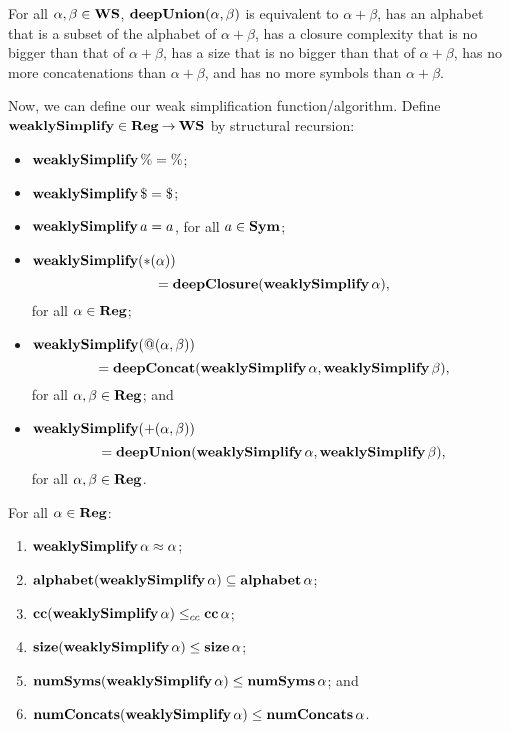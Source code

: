 \begin{lemma}
\label{DeepUnionLem}
For all $\alpha,\beta\in\mathbf{WS}$, $\mathbf{deepUnion}(\alpha,\beta)$
is equivalent to $\alpha+\beta$, has an alphabet that is a
subset of the alphabet of $\alpha+\beta$, has a closure complexity
that is no bigger than that of $\alpha+\beta$, has a size that is no
bigger than that of $\alpha+\beta$, has no more concatenations than
$\alpha+\beta$, and has no more symbols than $\alpha+\beta$.
\end{lemma}

Now, we can define our weak simplification function/algorithm.
%
Define $\mathbf{weaklySimplify}\in\mathbf{Reg}\mathbin{\to}\mathbf{WS}$ by structural recursion:
\begin{itemize}
\item $\mathbf{weaklySimplify}\,\% = \%$;

\item $\weaklySimplify\,\$ = \$$;

\item $\mathbf{weaklySimplify}\,a = a$, for all $a\in\mathbf{Sym}$;

\item $\mathbf{weaklySimplify}({*}(\alpha))$
  \begin{displaymath}
    {} = \mathbf{deepClosure}(\mathbf{weaklySimplify}\,\alpha) ,
  \end{displaymath}
  for all $\alpha\in\mathbf{Reg}$;

\item $\mathbf{weaklySimplify}(@(\alpha,\beta))$
  \begin{displaymath}
    {} = \mathbf{deepConcat}(\mathbf{weaklySimplify}\,\alpha, \mathbf{weaklySimplify}\,\beta) ,
  \end{displaymath}
  for all $\alpha,\beta\in\mathbf{Reg}$; and

\item $\mathbf{weaklySimplify}({+}(\alpha,\beta))$
  \begin{displaymath}
    {} = \mathbf{deepUnion}(\mathbf{weaklySimplify}\,\alpha, \mathbf{weaklySimplify}\,\beta) ,
  \end{displaymath}
  for all $\alpha,\beta\in\mathbf{Reg}$.
\end{itemize}

\begin{proposition}
\label{WeakSimpProp1}
For all $\alpha\in\mathbf{Reg}$:
\begin{enumerate}[\quad(1)]
\item $\mathbf{weaklySimplify}\,\alpha\approx\alpha$;

\item $\mathbf{alphabet}(\mathbf{weaklySimplify}\,\alpha)\subseteq\mathbf{alphabet}\,\alpha$;

\item $\mathbf{cc}(\mathbf{weaklySimplify}\,\alpha)\mathrel{\leq_{cc}}\mathbf{cc}\,\alpha$;

\item $\mathbf{size}(\mathbf{weaklySimplify}\,\alpha)\leq\mathbf{size}\,\alpha$;

\item $\mathbf{numSyms}(\mathbf{weaklySimplify}\,\alpha)\leq\mathbf{numSyms}\,\alpha$; and

\item $\mathbf{numConcats}(\mathbf{weaklySimplify}\,\alpha)\leq\mathbf{numConcats}\,\alpha$.
\end{enumerate}
\end{proposition}

